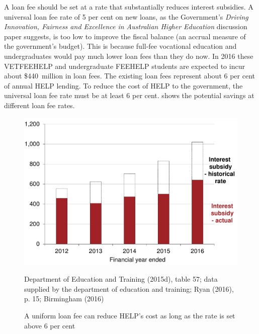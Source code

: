 \documentclass[embargoed]{grattan}
\begin{document}
{A loan fee should be set at a rate that substantially reduces interest subsidies.
A universal loan fee rate of 5 per cent on new loans, as the Government's \emph{Driving Innovation, Fairness and Excellence in Australian Higher Education} discussion paper suggests, is too low to improve the fiscal balance (an accrual measure of the government's budget).
This is because full-fee vocational education and undergraduates would pay much lower loan fees than they do now.
In 2016 these \gls{VETFEEHELP} and undergraduate \gls{FEEHELP} students are expected to incur about \$440~million in loan fees.
The existing loan fees represent about 6 per cent of annual \gls{HELP} lending.
To reduce the cost of \gls{HELP} to the government, the universal loan fee rate must be at least 6 per cent.
 shows the potential savings at different loan fee rates.

\begin{figure}
\caption[A uniform loan fee can reduce {HELP}'s cost as long as the rate is set above 6 per cent]{A uniform loan fee can reduce \gls{HELP}'s cost as long as the rate is set above 6 per cent}\label{fig:fig20-uniform-loan-fee-can-reduce-HELPs-cost-as-long-as-the-rate-is-set-above-6pc}

\includegraphics[page=20]{atlas/Chartpack.pdf}

%
{Department of Education and Training (2015d), table 57; data supplied by the department of education and training; Ryan (2016), p. 15; Birmingham (2016)}
\end{figure}

}
\end{document}
